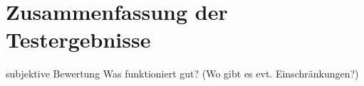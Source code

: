 \section{Zusammenfassung der Testergebnisse} 
subjektive Bewertung
Was funktioniert gut?
(Wo gibt es evt. Einschränkungen?)